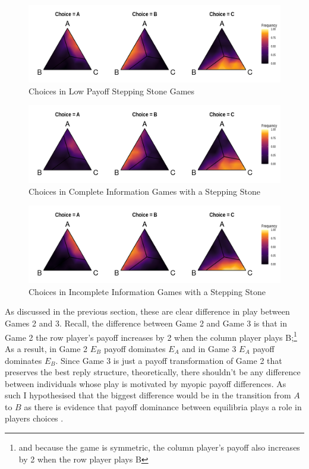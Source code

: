 \begin{figure}[h]
\captionsetup{justification=centering}
  \caption{Choices in Low Payoff Stepping Stone Games}
   \label{fig:Game3ChoiceFreq}
    \includegraphics[width = \textwidth]{Images/Game3ChoiceFreq.png}
\end{figure}

\begin{figure}[h]
\captionsetup{justification=centering}
  \caption{Choices in Complete Information Games with a Stepping Stone}
   \label{fig:GameCChoiceFreq}
    \includegraphics[width = \textwidth]{Images/GameCChoiceFreq.png}
\end{figure}

\begin{figure}[h]
\captionsetup{justification=centering}
  \caption{Choices in Incomplete Information Games with a Stepping Stone}
   \label{fig:GameIChoiceFreq}
    \includegraphics[width = \textwidth]{Images/GameIChoiceFreq.png}
\end{figure}

As discussed in the previous section, these are clear difference in play between Games 2 and 3. Recall, the difference between Game 2 and Game 3 is that in Game 2 the row player's payoff increases by 2 when the column player plays B;\footnote{and because the game is symmetric, the column player's payoff also increases by 2 when the row player plays B} As a result, in Game 2 $E_B$ payoff dominates $E_A$ and in Game 3 $E_A$ payoff dominates $E_B$. Since Game 3 is just a payoff transformation of Game 2 that preserves the best reply structure, theoretically, there shouldn't be any difference between individuals whose play is motivated by myopic payoff differences. As such I hypothesised that the biggest difference would be in the transition from $A$ to $B$ as there is evidence that payoff dominance between equilibria plays a role in players\textquotesingle{} choices \citep{harsanyi1988general, jagau2022}.

